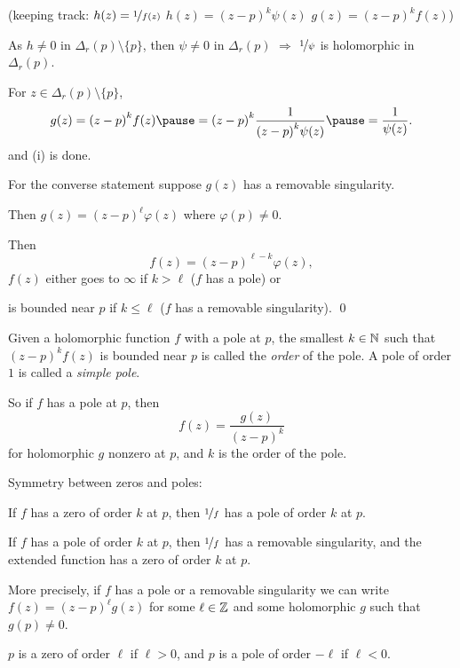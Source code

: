 \documentclass[10pt,aspectratio=169]{beamer}
\begin{document}
\begin{frame}
\hfill (keeping track: \quad $h(z) = \nicefrac{1}{f(z)}$ \quad
$h(z) = {(z-p)}^k \psi(z)$ \quad $g(z) = {(z-p)}^k f(z)$)

\medskip
\pause

As $h\not=0$ in $\Delta_r(p) \setminus \{p\}$,
then $\psi \not= 0$ in $\Delta_r(p)$
\quad $\Rightarrow$ \quad
$\nicefrac{1}{\psi}$ is holomorphic in $\Delta_r(p)$.

\medskip
\pause

For $z \in \Delta_r(p) \setminus \{p\}$,
\[
g(z) =
{(z-p)}^k f(z)
\pause
=
{(z-p)}^k \frac{1}{{(z-p)}^k \psi(z)}
\pause
=
\frac{1}{\psi(z)} .
\]
and (i) is done.

\medskip
\pause

For the converse statement suppose
$g(z)$ has a removable singularity.

\medskip
\pause

Then $g(z) = {(z-p)}^\ell \varphi(z)$ where
$\varphi(p) \not= 0$.

\medskip
\pause
Then
\[
f(z) = {(z-p)}^{\ell-k} \varphi(z) ,
\]
\pause
$f(z)$ either goes to $\infty$ if $k > \ell$ ($f$ has a pole) or
\pause

is bounded near $p$ if $k \leq \ell$ ($f$ has a removable singularity).
\qed
\end{frame}

\begin{frame}

\begin{definition}
Given a holomorphic function $f$ with a pole at $p$, the smallest $k \in {\mathbb{N}}$
such that ${(z-p)}^k f(z)$ is bounded near $p$ is called the
\emph{order} of the pole.
\pause
A pole of order $1$ is called a \emph{simple pole}.
\end{definition}
\pause

So if $f$
has a pole at $p$, then
\begin{equation*}
f(z) = \frac{g(z)}{{(z-p)}^k}
\end{equation*}
for holomorphic $g$ nonzero at $p$, and $k$ is the order of the pole.

\medskip
\pause

Symmetry between zeros and poles:
\medskip
\pause

If $f$ has a zero of order $k$ at $p$, then $\nicefrac{1}{f}$ has a pole of
order $k$ at $p$.

\medskip
\pause

If $f$ has a pole of order $k$ at $p$, then $\nicefrac{1}{f}$
has a removable singularity, and the extended function has a zero of order
$k$ at $p$.

\medskip
\pause

More precisely, if $f$ has a pole or a removable singularity we can write
$f(z) = {(z-p)}^\ell g(z)$ for some $\ell \in {\mathbb{Z}}$ and some holomorphic $g$ such
that $g(p) \not= 0$.

\medskip
\pause

$p$ is a zero of order $\ell$ if $\ell > 0$, and $p$ is a pole of order $-\ell$ if $\ell < 0$.

\end{frame}
\end{document}
